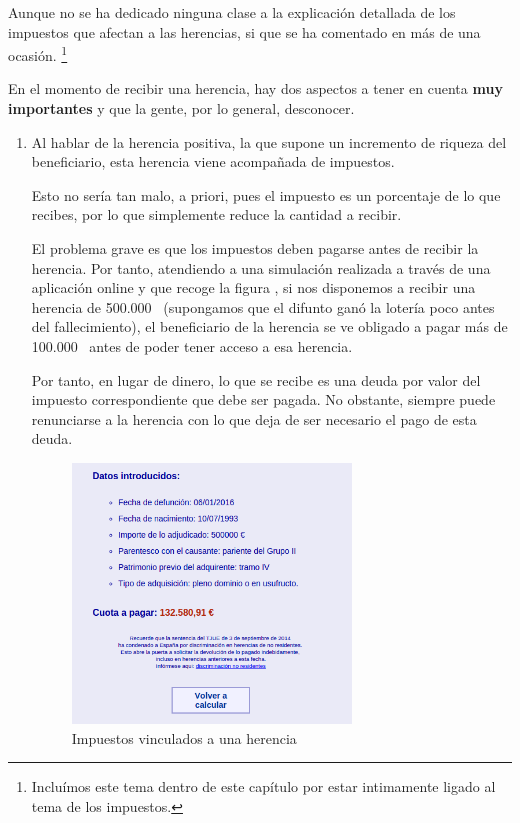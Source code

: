 \documentclass[nochap,palatino,shortheader]{apuntes}
\newcommand{\study}[1]{#1} \newcommand{\substudy}[1]{#1}
\begin{document}
Aunque no se ha dedicado ninguna clase a la explicación detallada de los impuestos que afectan a las herencias, si que se ha comentado en más de una ocasión. \footnote{Incluímos este tema dentro de este capítulo por estar intimamente ligado al tema de los impuestos.}


En el momento de recibir una herencia, hay dos aspectos a tener en cuenta \textbf{muy importantes} y que la gente, por lo general, desconocer.

\begin{enumerate}
\item Al hablar de la \study{herencia positiva}, la que supone un incremento de riqueza del beneficiario, esta herencia viene acompañada de impuestos.

Esto no sería tan malo, a priori, pues el impuesto es un porcentaje de lo que recibes, por lo que simplemente reduce la cantidad a recibir.

El problema grave es que los \study{impuestos} deben \study{pagarse antes de recibir} la herencia.
Por tanto, atendiendo a una simulación realizada a través de una aplicación online y que recoge la figura , si nos disponemos a recibir una herencia de 500.000 \texteuro \ (supongamos que el difunto ganó la lotería poco antes del fallecimiento), el beneficiario de la herencia se ve obligado a pagar más de 100.000 \texteuro\ antes de poder tener acceso a esa herencia.

Por tanto, en lugar de dinero, lo que se recibe es una deuda por valor del impuesto correspondiente que debe ser pagada. No obstante, siempre puede renunciarse a la herencia con lo que deja de ser necesario el pago de esta deuda.

\begin{figure}[hbtp]
\centering
\includegraphics[width=0.7\textwidth]{img/simulacion_sucesiones.png}
\caption{Impuestos vinculados a una herencia}
\label{fig:impuestoHerencia}
\end{figure}


\end{enumerate}
\end{document}
